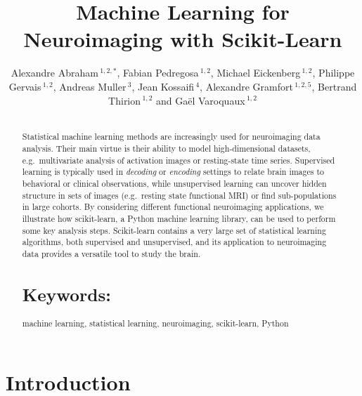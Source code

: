 \documentclass{frontiersSCNS} %
\def\firstAuthorLast{Alexandre Abraham {et~al}} %
\def\Authors{
    Alexandre Abraham\,$^{1,2,*}$,
    Fabian Pedregosa\,$^{1,2}$,
    Michael Eickenberg\,$^{1,2}$,
    Philippe Gervais\,$^{1,2}$,
    Andreas Muller\,$^{3}$,
    Jean Kossaifi\,$^{4}$,
    Alexandre Gramfort\,$^{1,2,5}$,
    Bertrand Thirion\,$^{1,2}$
    and Ga\"el Varoquaux\,$^{1,2}$}
\begin{document}
\onecolumn
{}

\title[Machine Learning for Neuroimaging with Scikit-Learn]{Machine Learning for Neuroimaging with Scikit-Learn}
\author[\firstAuthorLast ]{\Authors}
\address{}
\correspondance{}
\editor{}

\maketitle
\begin{abstract}

\section{}
Statistical machine learning methods are increasingly used for
neuroimaging data analysis. Their main virtue 
is their ability to model high-dimensional datasets, e.g.\ multivariate
analysis of activation images or resting-state time series.
Supervised learning is typically used in \emph{decoding} or
\emph{encoding} settings to relate
brain images to behavioral or clinical observations, while
unsupervised learning can uncover hidden structure in
sets of images (e.g.\ resting state functional MRI) or find
sub-populations in large cohorts. By considering
different functional neuroimaging applications, we illustrate how scikit-learn,
a Python machine learning library, can be used to perform some key
analysis steps. Scikit-learn contains a very large set of statistical
learning algorithms, both supervised and unsupervised, and its
application to neuroimaging data provides a versatile tool to study the
brain.


\tiny
\section{Keywords:} machine learning, statistical learning, neuroimaging,
scikit-learn, Python
\end{abstract}


\section{Introduction}
\end{document}
